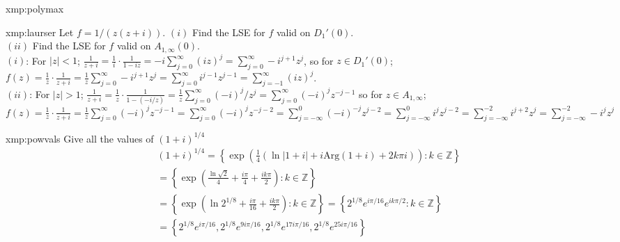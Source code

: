 \documentclass[landscape, 8pt]{extarticle}
\begin{document}
\begin{multicols*}{4}
\begin{xmp}{xmp:polymax}{ }
	\end{xmp}
	
	
	\begin{xmp-s}{xmp:laurser}{ }
		Let $f = 1/(z(z+i))$. $(i)$ Find the LSE for $f$ valid on $D_1'(0)$. \\
		$(ii)$ Find the LSE for $f$ valid on $A_{1, \infty}(0)$. \\
		$(i)$: For $\left|z\right| < 1$; $\frac{1}{z+i} = \frac{1}{i} \cdot \frac{1}{1-iz} = -i \sum_{j=0}^{\infty}(iz)^j = \sum_{j=0}^{\infty}-i^{j+1}z^j$, so for $z\in D_1'(0)$; $f(z) = \frac{1}{z} \cdot \frac{1}{z+i} = \frac{1}{z} \sum_{j=0}^{\infty}-i^{j+1} z^j = \sum_{j=0}^{\infty}i^{j-1} z^{j-1} = \sum_{j=-1}^{\infty}(iz)^j$.\\
		$(ii)$: For $\left|z\right| > 1$; $\frac{1}{z+i} = \frac{1}{z} \cdot \frac{1}{1-(-i/z)} = \frac{1}{z} \sum_{j=0}^{\infty} (-i)^j/z^j = \sum_{j=0}^{\infty}(-i)^jz^{-j-1}$ so for $z\in A_{1, \infty}$; $f(z) = \frac{1}{z} \cdot \frac{1}{z+i} = \frac{1}{z} \sum_{j=0}^{\infty}(-i)^jz^{-j-1} = \sum_{j=0}^{\infty}(-i)^j z^{-j-2} = \sum_{j=-\infty}^{0} (-i)^{-j}z^{j-2} = \sum_{j=-\infty}^{0} i^j z^{j-2} = \sum_{j=-\infty}^{-2} i^{j+2}z^j = \sum_{j=-\infty}^{-2} -i^jz^j$
		
	\end{xmp-s}
	
	
	\begin{xmp}{xmp:powvals}{ }
		Give all the values of $(1+i)^{1/4}$\\
			\begin{align*}
				&(1+i)^{1/4} =\left\{\exp\left(\frac{1}{4}(\ln\left|1+i\right| + i\text{Arg}(1+i) + 2k\pi i)\right) : k\in \mathbb{Z}\right\} \\
				&=\left\{\exp\left(\frac{\ln\sqrt{2}}{4} + \frac{i \pi}{4} + \frac{i k \pi}{2}\right) : k\in \mathbb{Z}\right\} \\
				&= \left\{\exp\left(\ln2^{1/8} + \frac{i \pi}{16} + \frac{i k \pi }{2}\right) : k\in \mathbb{Z}\right\} = \left\{2^{1/8}e^{i\pi/16}e^{i k \pi/2} : k\in \mathbb{Z}\right\} \\
				&= \left\{2^{1/8}e^{i \pi /16}, 2^{1/8}e^{9 i \pi /16}, 2^{1/8}e^{17 i \pi /16}, 2^{1/8}e^{25 i \pi/16}\right\}
			\end{align*}
		
	\end{xmp}
	
	
	
	\end{multicols*}	
	
\end{document}
